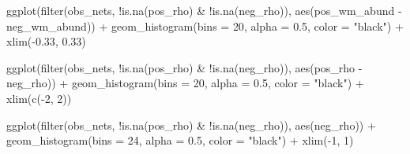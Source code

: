 \documentclass[
  letterpaper,
  DIV=11,
  numbers=noendperiod]{scrartcl}
\newenvironment{Shaded}{\begin{snugshade}}{\end{snugshade}}
\newcommand{\AttributeTok}[1]{\textcolor[rgb]{0.40,0.45,0.13}{#1}}
\newcommand{\DecValTok}[1]{\textcolor[rgb]{0.68,0.00,0.00}{#1}}
\newcommand{\FloatTok}[1]{\textcolor[rgb]{0.68,0.00,0.00}{#1}}
\newcommand{\FunctionTok}[1]{\textcolor[rgb]{0.28,0.35,0.67}{#1}}
\newcommand{\NormalTok}[1]{\textcolor[rgb]{0.00,0.23,0.31}{#1}}
\newcommand{\OtherTok}[1]{\textcolor[rgb]{0.00,0.23,0.31}{#1}}
\newcommand{\SpecialCharTok}[1]{\textcolor[rgb]{0.37,0.37,0.37}{#1}}
\newcommand{\StringTok}[1]{\textcolor[rgb]{0.13,0.47,0.30}{#1}}
\begin{document}
\begin{Shaded}
\begin{Highlighting}[]
\FunctionTok{ggplot}\NormalTok{(}\FunctionTok{filter}\NormalTok{(obs\_nets, }\SpecialCharTok{!}\FunctionTok{is.na}\NormalTok{(pos\_rho) }\SpecialCharTok{\&} \SpecialCharTok{!}\FunctionTok{is.na}\NormalTok{(neg\_rho)), }
       \FunctionTok{aes}\NormalTok{(pos\_wm\_abund }\SpecialCharTok{{-}}\NormalTok{ neg\_wm\_abund)) }\SpecialCharTok{+}
    \FunctionTok{geom\_histogram}\NormalTok{(}\AttributeTok{bins =} \DecValTok{20}\NormalTok{, }\AttributeTok{alpha =} \FloatTok{0.5}\NormalTok{, }\AttributeTok{color =} \StringTok{"black"}\NormalTok{) }\SpecialCharTok{+}
    \FunctionTok{xlim}\NormalTok{(}\SpecialCharTok{{-}}\FloatTok{0.33}\NormalTok{, }\FloatTok{0.33}\NormalTok{)}


\FunctionTok{ggplot}\NormalTok{(}\FunctionTok{filter}\NormalTok{(obs\_nets, }\SpecialCharTok{!}\FunctionTok{is.na}\NormalTok{(pos\_rho) }\SpecialCharTok{\&} \SpecialCharTok{!}\FunctionTok{is.na}\NormalTok{(neg\_rho)), }
       \FunctionTok{aes}\NormalTok{(pos\_rho }\SpecialCharTok{{-}}\NormalTok{ neg\_rho)) }\SpecialCharTok{+}
    \FunctionTok{geom\_histogram}\NormalTok{(}\AttributeTok{bins =} \DecValTok{20}\NormalTok{, }\AttributeTok{alpha =} \FloatTok{0.5}\NormalTok{, }\AttributeTok{color =} \StringTok{"black"}\NormalTok{) }\SpecialCharTok{+}
    \FunctionTok{xlim}\NormalTok{(}\FunctionTok{c}\NormalTok{(}\SpecialCharTok{{-}}\DecValTok{2}\NormalTok{, }\DecValTok{2}\NormalTok{))}

\FunctionTok{ggplot}\NormalTok{(}\FunctionTok{filter}\NormalTok{(obs\_nets, }\SpecialCharTok{!}\FunctionTok{is.na}\NormalTok{(pos\_rho) }\SpecialCharTok{\&} \SpecialCharTok{!}\FunctionTok{is.na}\NormalTok{(neg\_rho)), }
       \FunctionTok{aes}\NormalTok{(neg\_rho)) }\SpecialCharTok{+}
    \FunctionTok{geom\_histogram}\NormalTok{(}\AttributeTok{bins =} \DecValTok{24}\NormalTok{, }\AttributeTok{alpha =} \FloatTok{0.5}\NormalTok{, }\AttributeTok{color =} \StringTok{"black"}\NormalTok{) }\SpecialCharTok{+}
    \FunctionTok{xlim}\NormalTok{(}\SpecialCharTok{{-}}\DecValTok{1}\NormalTok{, }\DecValTok{1}\NormalTok{)}
\end{Highlighting}
\end{Shaded}

\begin{Shaded}
\end{Shaded}
\end{document}
